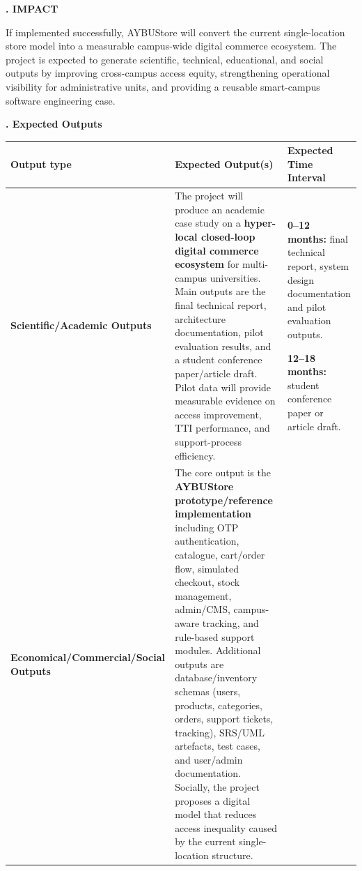 \documentclass[10pt,a4paper]{article}
\newcommand{\sectionlabel}[1]{\vspace{1.2em}\noindent\textbf{\fontsize{10.5}{12}\selectfont #1}\par\vspace{0.4em}}
\newcommand{\subhead}[1]{\vspace{0.8em}\noindent\textbf{\fontsize{10}{11}\selectfont #1}\par\vspace{0.3em}}
\begin{document}
\clearpage
\sectionlabel{4. IMPACT}

If implemented successfully, AYBUStore will convert the current single-location store model into a measurable campus-wide digital commerce ecosystem. The project is expected to generate scientific, technical, educational, and social outputs by improving cross-campus access equity, strengthening operational visibility for administrative units, and providing a reusable smart-campus software engineering case.

\subhead{4.1. Expected Outputs}

\small
\setlength\LTleft{0pt}
\setlength\LTright{0pt}
\begin{longtable}{|P{0.27\textwidth}|P{0.46\textwidth}|P{0.20\textwidth}|}
\hline
\textbf{Output type} & \textbf{Expected Output(s)} & \textbf{Expected Time Interval} \\ \hline
\textbf{Scientific/Academic Outputs}
& The project will produce an academic case study on a \textbf{hyper-local closed-loop digital commerce ecosystem} for multi-campus universities. Main outputs are the final technical report, architecture documentation, pilot evaluation results, and a student conference paper/article draft. Pilot data will provide measurable evidence on access improvement, TTI performance, and support-process efficiency.
& \textbf{0--12 months:} final technical report, system design documentation and pilot evaluation outputs.\par \textbf{12--18 months:} student conference paper or article draft. \\ \hline
\textbf{Economical/}\newline\textbf{Commercial/}\newline\textbf{Social Outputs}
& The core output is the \textbf{AYBUStore prototype/reference implementation} including OTP authentication, catalogue, cart/order flow, simulated checkout, stock management, admin/CMS, campus-aware tracking, and rule-based support modules. Additional outputs are database/inventory schemas (users, products, categories, orders, support tickets, tracking), SRS/UML artefacts, test cases, and user/admin documentation. Socially, the project proposes a digital model that reduces access inequality caused by the current single-location structure.

\end{longtable}
\end{document}
